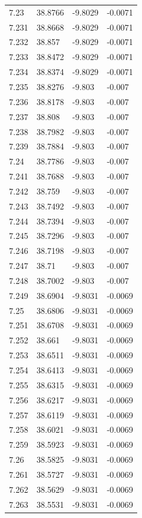 \begin{tabular}{llll}
7.23 & 38.8766 & -9.8029 & -0.0071 \\
7.231 & 38.8668 & -9.8029 & -0.0071 \\
7.232 & 38.857 & -9.8029 & -0.0071 \\
7.233 & 38.8472 & -9.8029 & -0.0071 \\
7.234 & 38.8374 & -9.8029 & -0.0071 \\
7.235 & 38.8276 & -9.803 & -0.007 \\
7.236 & 38.8178 & -9.803 & -0.007 \\
7.237 & 38.808 & -9.803 & -0.007 \\
7.238 & 38.7982 & -9.803 & -0.007 \\
7.239 & 38.7884 & -9.803 & -0.007 \\
7.24 & 38.7786 & -9.803 & -0.007 \\
7.241 & 38.7688 & -9.803 & -0.007 \\
7.242 & 38.759 & -9.803 & -0.007 \\
7.243 & 38.7492 & -9.803 & -0.007 \\
7.244 & 38.7394 & -9.803 & -0.007 \\
7.245 & 38.7296 & -9.803 & -0.007 \\
7.246 & 38.7198 & -9.803 & -0.007 \\
7.247 & 38.71 & -9.803 & -0.007 \\
7.248 & 38.7002 & -9.803 & -0.007 \\
7.249 & 38.6904 & -9.8031 & -0.0069 \\
7.25 & 38.6806 & -9.8031 & -0.0069 \\
7.251 & 38.6708 & -9.8031 & -0.0069 \\
7.252 & 38.661 & -9.8031 & -0.0069 \\
7.253 & 38.6511 & -9.8031 & -0.0069 \\
7.254 & 38.6413 & -9.8031 & -0.0069 \\
7.255 & 38.6315 & -9.8031 & -0.0069 \\
7.256 & 38.6217 & -9.8031 & -0.0069 \\
7.257 & 38.6119 & -9.8031 & -0.0069 \\
7.258 & 38.6021 & -9.8031 & -0.0069 \\
7.259 & 38.5923 & -9.8031 & -0.0069 \\
7.26 & 38.5825 & -9.8031 & -0.0069 \\
7.261 & 38.5727 & -9.8031 & -0.0069 \\
7.262 & 38.5629 & -9.8031 & -0.0069 \\
7.263 & 38.5531 & -9.8031 & -0.0069 \\

\end{tabular}
